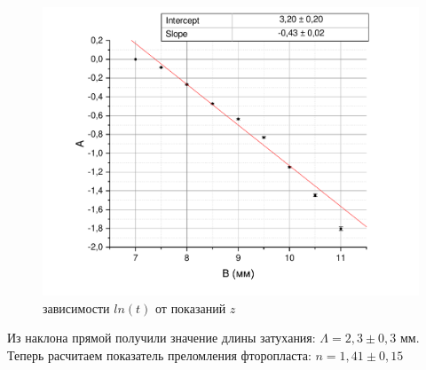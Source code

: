\documentclass[12pt]{article}
\begin{document}
\begin{figure}[!h]
\begin{center}
\includegraphics[width = \textwidth]{lnT}
\caption{зависимости $ln(t)$ от показаний $z$}
\end{center}
\end{figure}
Из наклона прямой получили значение длины затухания: $\Lambda = 2,3 \pm 0,3$ мм.\\
Теперь расчитаем показатель преломления фторопласта: $n = 1,41 \pm 0,15$\\
\newpage
\end{document}
